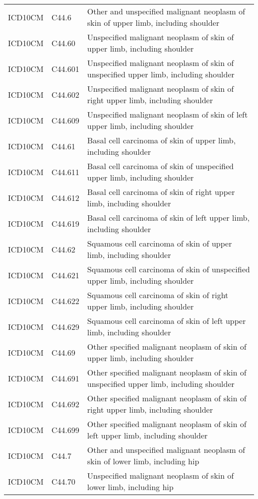 \begin{longtable}{p{}p{}p{}}
  ICD10CM & C44.6 & Other and unspecified malignant neoplasm of skin of upper limb, including shoulder \\ 
  ICD10CM & C44.60 & Unspecified malignant neoplasm of skin of upper limb, including shoulder \\ 
  ICD10CM & C44.601 & Unspecified malignant neoplasm of skin of unspecified upper limb, including shoulder \\ 
  ICD10CM & C44.602 & Unspecified malignant neoplasm of skin of right upper limb, including shoulder \\ 
  ICD10CM & C44.609 & Unspecified malignant neoplasm of skin of left upper limb, including shoulder \\ 
  ICD10CM & C44.61 & Basal cell carcinoma of skin of upper limb, including shoulder \\ 
  ICD10CM & C44.611 & Basal cell carcinoma of skin of unspecified upper limb, including shoulder \\ 
  ICD10CM & C44.612 & Basal cell carcinoma of skin of right upper limb, including shoulder \\ 
  ICD10CM & C44.619 & Basal cell carcinoma of skin of left upper limb, including shoulder \\ 
  ICD10CM & C44.62 & Squamous cell carcinoma of skin of upper limb, including shoulder \\ 
  ICD10CM & C44.621 & Squamous cell carcinoma of skin of unspecified upper limb, including shoulder \\ 
  ICD10CM & C44.622 & Squamous cell carcinoma of skin of right upper limb, including shoulder \\ 
  ICD10CM & C44.629 & Squamous cell carcinoma of skin of left upper limb, including shoulder \\ 
  ICD10CM & C44.69 & Other specified malignant neoplasm of skin of upper limb, including shoulder \\ 
  ICD10CM & C44.691 & Other specified malignant neoplasm of skin of unspecified upper limb, including shoulder \\ 
  ICD10CM & C44.692 & Other specified malignant neoplasm of skin of right upper limb, including shoulder \\ 
  ICD10CM & C44.699 & Other specified malignant neoplasm of skin of left upper limb, including shoulder \\ 
  ICD10CM & C44.7 & Other and unspecified malignant neoplasm of skin of lower limb, including hip \\ 
  ICD10CM & C44.70 & Unspecified malignant neoplasm of skin of lower limb, including hip \\ 

\end{longtable}
